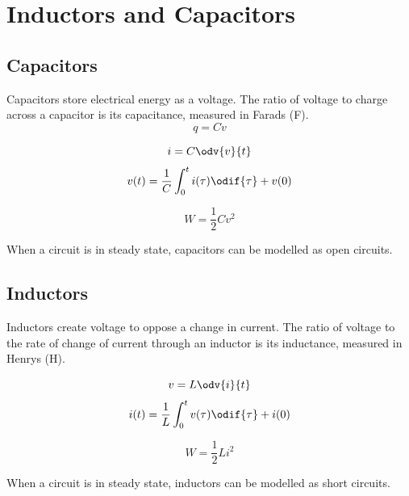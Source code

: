 \documentclass{article}
\begin{document}
\section{Inductors and Capacitors}
\subsection{Capacitors}
\begin{definition}
    Capacitors store electrical energy as a voltage. The ratio of voltage
    to charge across a capacitor is its capacitance, measured in Farads (\unit{\farad}).
    \begin{equation*}
        q = C v
    \end{equation*}
\end{definition}
\begin{definition}[VI Relationship]
    \begin{equation*}
        i = C \odv{v}{t}
    \end{equation*}
    \begin{equation*}
        v(t) = \frac{1}{C} \int_0^t i(\tau) \odif{\tau} + v(0)
    \end{equation*}
\end{definition}
\begin{definition}
    \begin{equation*}
        W = \frac{1}{2}Cv^2
    \end{equation*}
\end{definition}
\begin{theorem}
    When a circuit is in steady state, capacitors can be modelled as open circuits.
\end{theorem}
\subsection{Inductors}
\begin{definition}
    Inductors create voltage to oppose a change in current. The ratio of voltage
    to the rate of change of current through an inductor is its inductance, measured in Henrys (\unit{\henry}).
\end{definition}
\begin{definition}[VI Relationship]
    \begin{equation*}
        v = L \odv{i}{t}
    \end{equation*}
    \begin{equation*}
        i(t) = \frac{1}{L} \int_0^t v(\tau) \odif{\tau} + i(0)
    \end{equation*}
\end{definition}
\begin{definition}
    \begin{equation*}
        W = \frac{1}{2}Li^2
    \end{equation*}
\end{definition}
\begin{theorem}
    When a circuit is in steady state, inductors can be modelled as short circuits.
\end{theorem}
\newpage
\end{document}
